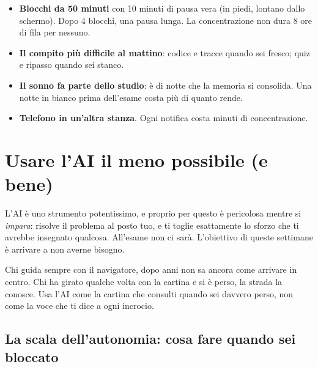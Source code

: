 \begin{itemize}
  \item \textbf{Blocchi da 50 minuti} con 10 minuti di pausa vera (in piedi, lontano dallo
        schermo). Dopo 4 blocchi, una pausa lunga. La concentrazione non dura 8 ore di
        fila per nessuno.
  \item \textbf{Il compito più difficile al mattino}: codice e tracce quando sei fresco;
        quiz e ripasso quando sei stanco.
  \item \textbf{Il sonno fa parte dello studio}: è di notte che la memoria si consolida.
        Una notte in bianco prima dell'esame costa più di quanto rende.
  \item \textbf{Telefono in un'altra stanza}. Ogni notifica costa minuti di concentrazione.
\end{itemize}

\section{Usare l'AI il meno possibile (e bene)}

L'AI è uno strumento potentissimo, e proprio per questo è pericolosa mentre si
\emph{impara}: risolve il problema al posto tuo, e ti toglie esattamente lo sforzo che ti
avrebbe insegnato qualcosa. All'esame non ci sarà. L'obiettivo di queste settimane è
arrivare a non averne bisogno.

\begin{analogia}[: il navigatore]
Chi guida sempre con il navigatore, dopo anni non sa ancora come arrivare in centro. Chi
ha girato qualche volta con la cartina e si è perso, la strada la conosce. Usa l'AI come
la cartina che consulti quando sei davvero perso, non come la voce che ti dice
 a ogni incrocio.
\end{analogia}

\subsection*{La scala dell'autonomia: cosa fare quando sei bloccato}

